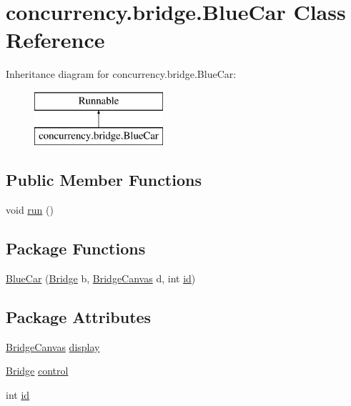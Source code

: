 \hypertarget{classconcurrency_1_1bridge_1_1_blue_car}{}\section{concurrency.\+bridge.\+Blue\+Car Class Reference}
\label{classconcurrency_1_1bridge_1_1_blue_car}
Inheritance diagram for concurrency.\+bridge.\+Blue\+Car\+:\begin{figure}[H]
\begin{center}
\leavevmode
\includegraphics[height=2.000000cm]{classconcurrency_1_1bridge_1_1_blue_car}
\end{center}
\end{figure}
\subsection*{Public Member Functions}
\begin{DoxyCompactItemize}
\item 
void \mbox{\hyperlink{classconcurrency_1_1bridge_1_1_blue_car_a84ca0b197c2136a10ab48951d3de37e6}{run}} ()
\end{DoxyCompactItemize}
\subsection*{Package Functions}
\begin{DoxyCompactItemize}
\item 
\mbox{\hyperlink{classconcurrency_1_1bridge_1_1_blue_car_a2d4360a4d3ac41e63613fe7aa9085aca}{Blue\+Car}} (\mbox{\hyperlink{classconcurrency_1_1bridge_1_1_bridge}{Bridge}} b, \mbox{\hyperlink{classconcurrency_1_1bridge_1_1_bridge_canvas}{Bridge\+Canvas}} d, int \mbox{\hyperlink{classconcurrency_1_1bridge_1_1_blue_car_aa1067ebee91729df39dc3171168f8dfc}{id}})
\end{DoxyCompactItemize}
\subsection*{Package Attributes}
\begin{DoxyCompactItemize}
\item 
\mbox{\hyperlink{classconcurrency_1_1bridge_1_1_bridge_canvas}{Bridge\+Canvas}} \mbox{\hyperlink{classconcurrency_1_1bridge_1_1_blue_car_ae92ab1f7f39265be8271d7b7affdc5e2}{display}}
\item 
\mbox{\hyperlink{classconcurrency_1_1bridge_1_1_bridge}{Bridge}} \mbox{\hyperlink{classconcurrency_1_1bridge_1_1_blue_car_aabbbdb924664b29e7a682e55862112aa}{control}}
\item 
int \mbox{\hyperlink{classconcurrency_1_1bridge_1_1_blue_car_aa1067ebee91729df39dc3171168f8dfc}{id}}
\end{DoxyCompactItemize}


